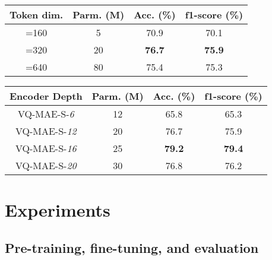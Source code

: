 \documentclass{article}
\begin{document}
\begin{table*}[t]
\begin{minipage}{.5\linewidth}
    \end{minipage}\hfill
    \begin{minipage}{.45\linewidth}
      \centering
        \caption{Performance of VQ-MAE-S-\emph{12} on RAVDESS-Speech for different continuous embedding sizes. Masking method: Random time-frequency masking (Patch-\emph{tf}); Ratio: 80\%}
        \label{tab:dim}
            \begin{tabular}{c|ccc}
                Token dim.     & Parm. \small{(M)} & Acc. \small{(\%)} & f1-score \small{(\%)}\\ \hline
                =160                & 5 & 70.9           &  70.1        \\
                =320                & 20 &\textbf{76.7}           &     \textbf{75.9}       \\
                =640                & 80 & 75.4           &   75.3     
            \end{tabular}
    \end{minipage} 
    \hfill
    \begin{minipage}{.5\linewidth}
      \centering
        \caption{Performance of VQ-MAE-S on RAVDESS-Speech for different encoder depths. Masking method: Random time-frequency masking (Patch-\emph{tf}); Ratio: 80\%.}
        \label{tab:depth}
            \begin{tabular}{c|ccc}
                Encoder Depth     & Parm. \small{(M)} & Acc. \small{(\%)} & f1-score \small{(\%)}\\ \hline
                VQ-MAE-S-\emph{6}  & 12 & 65.8           &    65.3      \\
                VQ-MAE-S-\emph{12} & 20 & 76.7           &    75.9         \\
                VQ-MAE-S-\emph{16} & 25 & \textbf{79.2}           &  \textbf{79.4}      \\
                VQ-MAE-S-\emph{20} & 30 & 76.8 &  76.2      
            \end{tabular}
    \end{minipage}

\end{table*}

\section{Experiments}
\subsection{Pre-training, fine-tuning, and evaluation}   
\end{document}
